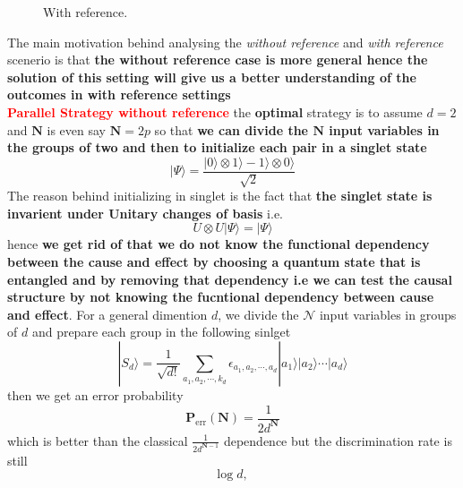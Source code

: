 \documentclass[a4paper,11pt]{article}
\begin{document}
\begin{figure}
\begin{minipage}{0.45\textwidth}
		\caption{With reference.}
		\label{circ:parallel-strategy-with-reference}
	\end{minipage}
\end{figure}
The main motivation behind analysing the \textit{without reference} and \textit{with reference} scenerio is that \textbf{the without reference case is more general hence the solution of this setting will give us a better understanding of the outcomes in with reference settings}
\\

\textbf{\textcolor{red}{Parallel Strategy without reference}} the \textbf{optimal} strategy is to assume $d=2$ and $\mathbf{N}$ is even say $\mathbf{N}=2p$ so that \textbf{we can divide the $\mathbf{N}$ input variables in the groups of two and then to initialize each pair in a singlet state}
\begin{equation}
	|\Psi\rangle = \frac{ |0 \rangle \otimes 1 \rangle - 1 \rangle \otimes 0 \rangle }{\sqrt{2}}
\end{equation}
The reason behind initializing in singlet is the fact that \textbf{the singlet state is invarient under Unitary changes of basis} i.e. 
\begin{equation}
	U\otimes U |\Psi\rangle = |\Psi\rangle
\end{equation}
hence \textbf{we get rid of that we do not know the functional dependency between the cause and effect by choosing a quantum state that is entangled and by removing that dependency i.e we can test the causal structure by not knowing the fucntional dependency between cause and effect}. For a general dimention $d$, we divide the $\mathcal{N}$ input variables in groups of $d$ and prepare each group in the following sinlget
\begin{equation}
	|S_d\rangle = \frac{1}{\sqrt{d!}}\sum_{a_1,a_2,\cdots,k_d}^{}\epsilon_{a_1,a_2,\cdots,a_d}  |a_1\rangle|a_2\rangle\cdots|a_d\rangle
\end{equation}
then we get an error probability
\begin{equation}
	\mathbf{P}_\text{err}(\mathbf{N})=\frac{1}{2d^\mathbf{N}}
\end{equation}
which is better than the classical $\frac{1}{2d^{\mathbf{N}-1}}$ dependence but the discrimination rate is still
\begin{equation}
	\text{log}\; d,
\end{equation}
\\
\end{document}
